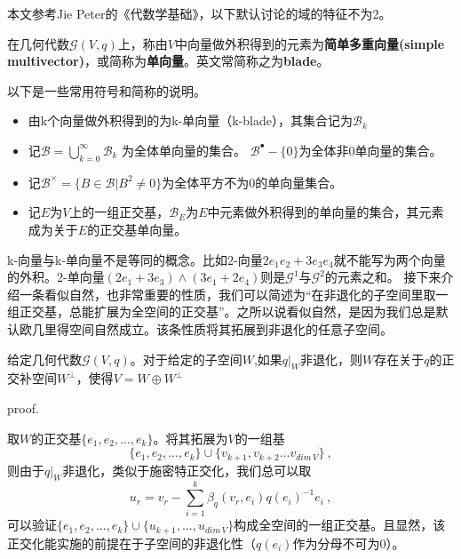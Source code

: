 

\begin{issues}
\issueTODO
\end{issues}

本文参考Jie Peter的《代数学基础》，以下默认讨论的域的特征不为2。

\begin{definition}{}
在几何代数$\mathcal G(V,q)$上，称由$V$中向量做外积得到的元素为\textbf{简单多重向量(simple multivector)}，或简称为\textbf{单向量}。英文常简称之为\textbf{blade}。

以下是一些常用符号和简称的说明。
\begin{itemize}
\item 由k个向量做外积得到的为k-单向量（k-blade），其集合记为$\mathcal B_k$
\item 记$\mathcal B=\bigcup \limits ^{\infty}_{k=0}\mathcal B_k$
为全体单向量的集合。
$\mathcal B^{\bullet}-\{0\}$为全体非0单向量的集合。
\item 记$\mathcal B^{\times}=\{B\in\mathcal B|B^2\neq0\}$为全体平方不为0的单向量集合。
\item 记$E$为$V$上的一组正交基，$\mathcal B_E$为$E$中元素做外积得到的单向量的集合，其元素成为关于$E$的正交基单向量。
\end{itemize}
\end{definition}
k-向量与k-单向量不是等同的概念。比如2-向量$2e_1e_2+3e_3e_4$就不能写为两个向量的外积。2-单向量$(2e_1+3e_3)\wedge(3e_1+2e_4)$则是$\mathcal G^1$与$\mathcal G^2$的元素之和。
接下来介绍一条看似自然，也非常重要的性质，我们可以简述为“在非退化的子空间里取一组正交基，总能扩展为全空间的正交基”。之所以说看似自然，是因为我们总是默认欧几里得空间自然成立。该条性质将其拓展到非退化的任意子空间。
\begin{theorem}{}
给定几何代数$\mathcal G(V,q)$。对于给定的子空间$W$,如果$q|_W$非退化，则$W$存在关于$q$的正交补空间$W^{\bot}$，使得$V=W\oplus W^{\bot}$
\end{theorem}

proof.

取$W$的正交基$\{e_1,e_2,...,e_k\}$。将其拓展为$V$的一组基
\begin{equation}
\{e_1,e_2,...,e_k\}\cup\{v_{k+1},v_{k+2}...v_{dim \,V}\}~,
\end{equation}
则由于$q|_W$非退化，类似于施密特正交化，我们总可以取
\begin{equation}
u_r=v_r-\sum ^{k}_{i=1}\beta_q(v_r,e_i)q(e_i)^{-1}e_i~,
\end{equation}
可以验证$\{e_1,e_2,...,e_k\}\cup\{u_{k+1},...,u_{dim\,V}\}$构成全空间的一组正交基。且显然，该正交化能实施的前提在于子空间的非退化性（$q(e_i)$作为分母不可为$0$）。

